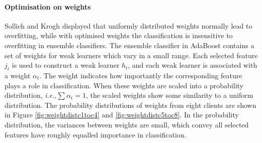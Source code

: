 \paragraph{Optimisation on weights}
Sollich and Krogh \cite{Sollich1995} displayed that uniformly distributed weights normally lead to overfitting, while with optimised weights the classification is insensitive to overfitting in ensemble classifiers. The ensemble classifier in AdaBoost contains a set of weights for weak learners which vary in a small range. Each selected feature $j_t$ is used to construct a weak learner $h_t$, and each weak learner is associated with a weight $\alpha_t$. The weight indicates how importantly the corresponding feature plays a role in classification. When these weights are scaled into a probability distribution, \textit{i.e.},$\sum \alpha_t = 1$, the scaled weights show some similarity to a uniform distribution. The probability distributions of weights from eight clients are shown in \mbox{Figure} \ref{fig:weightdistc1toc4} and \ref{fig:weightdistc5toc8}. In the probability distribution, the variances between weights are small, which convey all selected features have roughly equalled importance in classification. 
